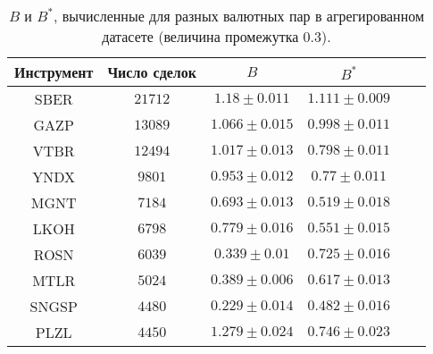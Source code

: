 \begin{table}[h!]
    \begin{center}
        \begin{tabular}{|c|c|c|c|c|c|}
            \hline
            Инструмент & Число сделок & $B$               & $B ^*$            \\ \hline
            SBER & $21712$ & $1.18 \pm 0.011$ & $1.111 \pm 0.009$ \\ \hline
            GAZP       & $13089$      & $1.066 \pm 0.015$ & $0.998 \pm 0.011$ \\ \hline
            VTBR       & $12494$      & $1.017 \pm 0.013$ & $0.798 \pm 0.011$ \\ \hline
            YNDX       & $9801$       & $0.953 \pm 0.012$ & $0.77 \pm 0.011$  \\ \hline
            MGNT       & $7184$       & $0.693 \pm 0.013$ & $0.519 \pm 0.018$ \\ \hline
            LKOH       & $6798$       & $0.779 \pm 0.016$ & $0.551 \pm 0.015$ \\ \hline
            ROSN       & $6039$       & $0.339 \pm 0.01$  & $0.725 \pm 0.016$ \\ \hline
            MTLR       & $5024$       & $0.389 \pm 0.006$ & $0.617 \pm 0.013$ \\ \hline
            SNGSP      & $4480$       & $0.229 \pm 0.014$ & $0.482 \pm 0.016$ \\ \hline
            PLZL       & $4450$       & $1.279 \pm 0.024$ & $0.746 \pm 0.023$ \\ \hline
        \end{tabular}
    \end{center}\caption{$B$ и $B ^*$, вычисленные для разных валютных пар в агрегированном датасете (величина промежутка 0.3).}
    \label{Aggreg1CU0.3} \end{table}

